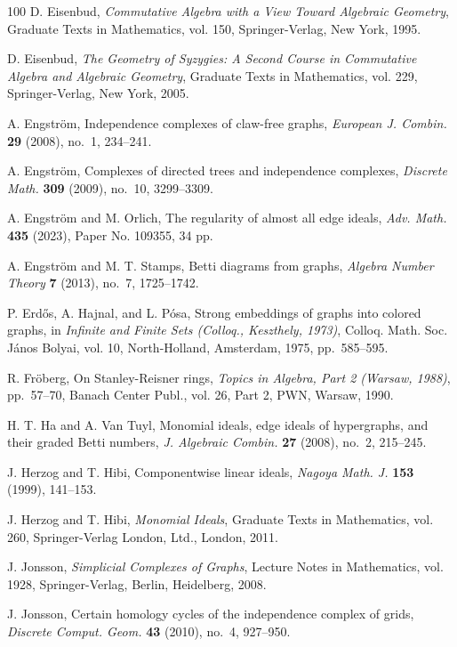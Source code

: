 \documentclass{article}
\theoremstyle{plain}
\theoremstyle{definition}
\begin{document}
\begin{thebibliography}{100}
D. Eisenbud, \emph{Commutative Algebra with a View Toward Algebraic Geometry}, Graduate Texts in Mathematics, vol. 150, Springer-Verlag, New York, 1995.

D. Eisenbud, \emph{The Geometry of Syzygies: A Second Course in Commutative Algebra and Algebraic Geometry}, Graduate Texts in Mathematics, vol. 229, Springer-Verlag, New York, 2005.

A. Engstr\"{o}m, Independence complexes of claw-free graphs, \emph{European J. Combin.} \textbf{29} (2008), no.~1, 234--241.

A. Engstr\"{o}m, Complexes of directed trees and independence complexes, \emph{Discrete Math.} \textbf{309} (2009), no.~10, 3299--3309.

A. Engstr\"{o}m and M. Orlich, The regularity of almost all edge ideals, \emph{Adv. Math.} \textbf{435} (2023), Paper No. 109355, 34 pp.

A. Engstr\"{o}m and M. T. Stamps, Betti diagrams from graphs, \emph{Algebra Number Theory} \textbf{7} (2013), no.~7, 1725--1742.

P. Erd\H{o}s, A. Hajnal, and L. P\'osa, Strong embeddings of graphs into colored graphs, in \emph{Infinite and Finite Sets (Colloq., Keszthely, 1973)}, Colloq. Math. Soc. J\'anos Bolyai, vol. 10, North-Holland, Amsterdam, 1975, pp.~585--595.

R. Fröberg, On Stanley-Reisner rings, \emph{Topics in Algebra, Part 2 (Warsaw, 1988)}, pp.~57--70, Banach Center Publ., vol. 26, Part 2, PWN, Warsaw, 1990.

H. T. Ha and A. Van Tuyl, Monomial ideals, edge ideals of hypergraphs, and their graded Betti numbers, \emph{J. Algebraic Combin.} \textbf{27} (2008), no.~2, 215--245.

J. Herzog and T. Hibi, Componentwise linear ideals, \emph{Nagoya Math. J.} \textbf{153} (1999), 141--153.

J. Herzog and T. Hibi, \emph{Monomial Ideals}, Graduate Texts in Mathematics, vol. 260, Springer-Verlag London, Ltd., London, 2011.

J. Jonsson, \emph{Simplicial Complexes of Graphs}, Lecture Notes in Mathematics, vol. 1928, Springer-Verlag, Berlin, Heidelberg, 2008.

J. Jonsson, Certain homology cycles of the independence complex of grids, \emph{Discrete Comput. Geom.} \textbf{43} (2010), no.~4, 927--950.


\end{thebibliography}
\end{document}
